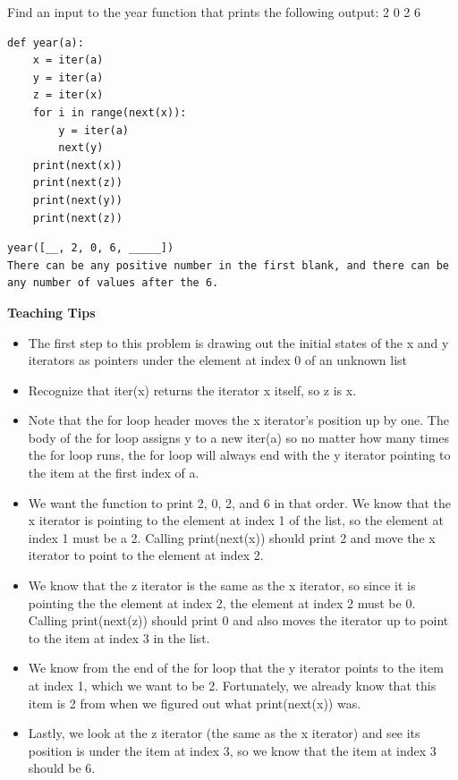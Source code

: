 \begin{blocksection}
    \question Find an input to the year function that prints the following output:
    2
    0
    2
    6
    
    \begin{lstlisting}
def year(a):
    x = iter(a)
    y = iter(a)
    z = iter(x)
    for i in range(next(x)):
        y = iter(a)
        next(y)
    print(next(x))
    print(next(z))
    print(next(y))
    print(next(z))
\end{lstlisting}
    
    \begin{solution}[1in]
    \begin{lstlisting}
year([__, 2, 0, 6, _____])
There can be any positive number in the first blank, and there can be any number of values after the 6.
\end{lstlisting}
    \end{solution}
    \end{blocksection}
    
    \begin{guide}
    \begin{blocksection}
        \textbf{Teaching Tips}
        \begin{itemize}
        \item The first step to this problem is drawing out the initial states of the x and y iterators as pointers under the element at index 0 of an unknown list
        \item Recognize that iter(x) returns the iterator x itself, so z is x.
        \item Note that the for loop header moves the x iterator's position up by one. The body of the for loop assigns y to a new iter(a) so no matter how many times the for loop runs, the for loop will always end with the y iterator pointing to the item at the first index of a.
        \item We want the function to print 2, 0, 2, and 6 in that order. We know that the x iterator is pointing to the element at index 1 of the list, so the element at index 1 must be a 2. Calling print(next(x)) should print 2 and move the x iterator to point to the element at index 2.
        \item We know that the z iterator is the same as the x iterator, so since it is pointing the the element at index 2, the element at index 2 must be 0. Calling print(next(z)) should print 0 and also moves the iterator up to point to the item at index 3 in the list.
        \item We know from the end of the for loop that the y iterator points to the item at index 1, which we want to be 2. Fortunately, we already know that this item is 2 from when we figured out what print(next(x)) was.
        \item Lastly, we look at the z iterator (the same as the x iterator) and see its position is under the item at index 3, so we know that the item at index 3 should be 6. 
        \end{itemize}
    \end{blocksection}
    \end{guide}